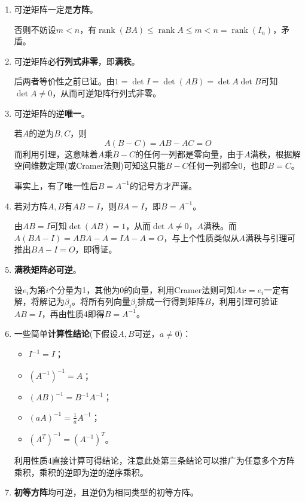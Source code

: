 \documentclass[a4paper,UTF8,fontset=windows]{ctexart}
\DeclareMathOperator{\rank}{rank}
\newcommand*{\note}{\noindent *}
\begin{document}
\begin{enumerate}
    \item 可逆矩阵一定是\textbf{方阵}。
    
    否则不妨设$m<n$，有$\rank(BA)\le\rank A\le m<n=\rank(I_n)$，矛盾。
    
    \item 可逆矩阵必\textbf{行列式非零}，即\textbf{满秩}。
    
    后两者等价性之前已证。由$1=\det I=\det(AB)=\det A\det B$可知$\det A\ne0$，从而可逆矩阵行列式非零。

    \item 可逆矩阵的逆\textbf{唯一}。
    
    若$A$的逆为$B,C$，则
    $$A(B-C)=AB-AC=O$$
    而利用引理，这意味着$A$乘$B-C$的任何一列都是零向量，由于$A$满秩，根据解空间维数定理(或Cramer法则)可知这只能$B-C$任何一列都全0，也即$B=C$。

    \note 事实上，有了唯一性后$B=A^{-1}$的记号方才严谨。

    \item 若对方阵$A,B$有$AB=I$，则$BA=I$，即$B=A^{-1}$。
    
    由$AB=I$可知$\det(AB)=1$，从而$\det A\ne0$，$A$满秩。而$A(BA-I)=ABA-A=IA-A=O$，与上个性质类似从$A$满秩与引理可推出$BA-I=O$，即得证。

    \item \textbf{满秩矩阵必可逆}。
    
    设$e_i$为第$i$个分量为1，其他为0的向量，利用Cramer法则可知$Ax=e_i$一定有解，将解记为$\beta_i$。将所有列向量$\beta_i$排成一行得到矩阵$B$，利用引理可验证$AB=I$，再由性质4即得$B=A^{-1}$。

    \item 一些简单\textbf{计算性结论}(下假设$A,B$可逆，$a\ne0$)：
    \begin{itemize}
        \item $I^{-1}=I$；
        \item $(A^{-1})^{-1}=A$；
        \item $(AB)^{-1}=B^{-1}A^{-1}$；
        \item $(aA)^{-1}=\frac{1}{a}A^{-1}$；
        \item $(A^T)^{-1}=(A^{-1})^T$。
    \end{itemize}

    利用性质4直接计算可得结论，注意此处第三条结论可以推广为任意多个方阵乘积，乘积的逆即为逆的逆序乘积。

    \item \textbf{初等方阵}均可逆，且逆仍为相同类型的初等方阵。
    

\end{enumerate}
\end{document}
